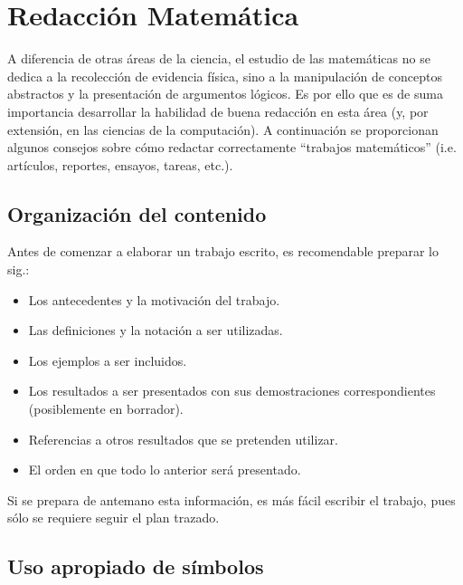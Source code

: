 \chapter{Redacción Matemática}

A diferencia de otras áreas de la ciencia, el estudio de las matemáticas
no se dedica a la recolección de evidencia física, sino a la manipulación
de conceptos abstractos y la presentación de argumentos lógicos. Es
por ello que es de suma importancia desarrollar la habilidad de buena
redacción en esta área (y, por extensión, en las ciencias de la 
computación). A continuación se proporcionan algunos consejos sobre cómo 
redactar correctamente ``trabajos matemáticos''
(i.e. artículos, reportes, ensayos, tareas, etc.).

\section{Organización del contenido}

Antes de comenzar a elaborar un trabajo escrito, es recomendable preparar
lo sig.:

\begin{itemize}
    \item Los antecedentes y la motivación del trabajo.
    \item Las definiciones y la notación a ser utilizadas.
    \item Los ejemplos a ser incluidos.
    \item Los resultados a ser presentados con sus demostraciones correspondientes
    (posiblemente en borrador). 
    \item Referencias a otros resultados que se pretenden utilizar.
    \item El orden en que todo lo anterior será presentado.
\end{itemize}

Si se prepara de antemano esta información, es más fácil escribir
el trabajo, pues sólo se requiere seguir el plan trazado.

\section{Uso apropiado de símbolos}

